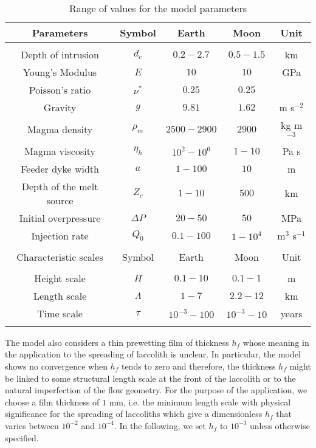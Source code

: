 \begin{table}[h!]
  \caption{Range of values for the model parameters}
  \centering
  \begin{tabular}{c|c|c|c|c}
    Parameters& Symbol & Earth & Moon&Unit\\
    \hline
              &&&&\\
    Depth of intrusion & $d_c$ & $0.2-2.7$ &$0.5-1.5$ &km \\
    Young's Modulus & $E$ & $10$ &$10$ &GPa \\
    Poisson's ratio & $\nu^*$ & $0.25$ &$0.25$ &\\
    Gravity & $g$ & $9.81$ &$1.62$&m s$^{-2}$ \\
    Magma density & $\rho_{m}$ & $2500-2900$ &$2900$&kg m$^{-3}$ \\
    Magma viscosity & $\eta_h $ & $10^2-10^{6}$ &$1-10$&Pa s \\
    Feeder dyke width & $a$ & $1-100$ &$10$&m \\
    Depth of the melt source & $Z_{c}$ & $ 1-10$&$ 500$& km \\ 
    Initial overpressure & $\Delta P$ & $20-50$ &$50$ &MPa \\
    Injection rate & $Q_{0}$ &$0.1-100$ &$1-10^4$&m$^{3}$ s$^{-1}$ \\
              &&&&\\
    \hline
    Characteristic scales & Symbol & Earth & Moon&Unit\\
    \hline
              &&&&\\
    Height scale & $H$& $0.1-10$ &$0.1-1$ &m \\
    Length scale & $\Lambda$ & $1-7$&$2.2-12$& km \\
    Time scale & $\tau$ & $10^{-3}-100$&$10^{-3}-10$& years \\
    \label{C2-tab2}
  \end{tabular} 
\end{table}

The model  also considers  a thin prewetting  film of  thickness $h_f$
whose  meaning in  the application  to the  spreading of  laccolith is
unclear.  In  particular, the  model shows  no convergence  when $h_f$
tends to zero \citep{Lister:2013ia} and therefore, the thickness $h_f$
might be  linked to some structural  length scale at the  front of the
laccolith or  to the natural  imperfection of the flow  geometry.  For
the purpose of the application, we  choose a film thickness of $1$ mm,
i.e.   the minimum  length scale  with physical  significance for  the
spreading of laccoliths  which give a dimensionless  $h_f$ that varies
between $10^{-2}$  and $10^{-4}$.  In  the following, we set  $h_f$ to
$10^{-3}$ unless otherwise specified.

